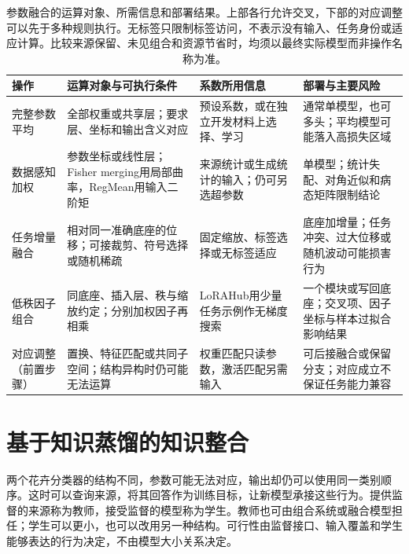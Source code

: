 \begin{table}[htbp]
  \centering
  \small
  \setlength{\tabcolsep}{4pt}
  \renewcommand{\arraystretch}{1.2}
  \begin{tabularx}{\linewidth}{@{}>{\raggedright\arraybackslash}p{24mm}
      >{\raggedright\arraybackslash}X
      >{\raggedright\arraybackslash}X
      >{\raggedright\arraybackslash}X@{}}
    \toprule
    操作 & 运算对象与可执行条件 & 系数所用信息 & 部署与主要风险 \\
    \midrule
    完整参数平均 & 全部权重或共享层；要求层、坐标和输出含义对应 & 预设系数，或在独立开发材料上选择、学习 & 通常单模型，也可多头；平均模型可能落入高损失区域 \\
    \addlinespace
    数据感知加权 & 参数坐标或线性层；Fisher merging用局部曲率，RegMean用输入二阶矩 & 来源统计或生成统计的输入；仍可另选超参数 & 单模型；统计失配、对角近似和病态矩阵限制结论 \\
    \addlinespace
    任务增量融合 & 相对同一准确底座的位移；可接裁剪、符号选择或随机稀疏 & 固定缩放、标签选择或无标签适应 & 底座加增量；任务冲突、过大位移或随机波动可能损害行为 \\
    \addlinespace
    低秩因子组合 & 同底座、插入层、秩与缩放约定；分别加权因子再相乘 & LoRAHub用少量任务示例作无梯度搜索 & 一个模块或写回底座；交叉项、因子坐标与样本过拟合影响结果 \\
    \midrule
    对应调整（前置步骤） & 置换、特征匹配或共同子空间；结构异构时仍可能无法运算 & 权重匹配只读参数，激活匹配另需输入 & 可后接融合或保留分支；对应成立不保证任务能力兼容 \\
    \bottomrule
  \end{tabularx}
  \caption{参数融合的运算对象、所需信息和部署结果。上部各行允许交叉，下部的对应调整可以先于多种规则执行。无标签只限制标签访问，不表示没有输入、任务身份或适应计算。比较来源保留、未见组合和资源节省时，均须以最终实际模型而非操作名称为准。}
  \label{tab:ket-integration-merging-operations}
\end{table}

\section{基于知识蒸馏的知识整合}
\label{sec:ket-integration-distillation}

两个花卉分类器的结构不同，参数可能无法对应，输出却仍可以使用同一类别顺序。这时可以查询来源，将其回答作为训练目标，让新模型承接这些行为。提供监督的来源称为教师，接受监督的模型称为学生。教师也可由组合系统或融合模型担任；学生可以更小，也可以改用另一种结构。可行性由监督接口、输入覆盖和学生能够表达的行为决定，不由模型大小关系决定。

